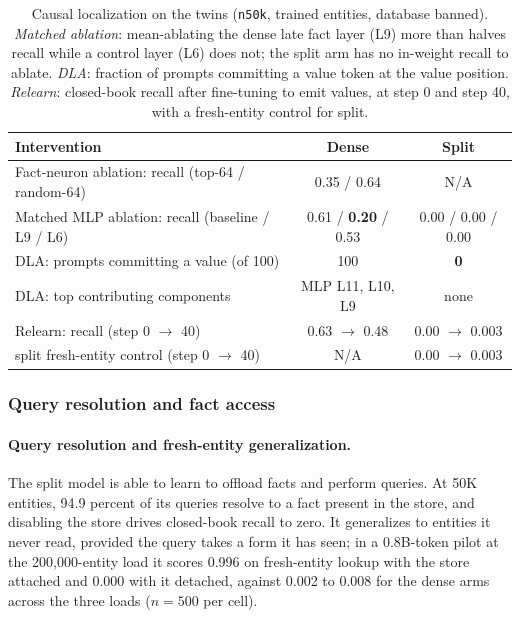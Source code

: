 \documentclass{article}
\begin{document}
\begin{table}[!htbp]
\centering
\small
\caption{Causal localization on the twins (\texttt{n50k}, trained entities, database banned). \emph{Matched ablation}: mean-ablating the dense late fact layer (L9) more than halves recall while a control layer (L6) does not; the split arm has no in-weight recall to ablate. \emph{DLA}: fraction of prompts committing a value token at the value position. \emph{Relearn}: closed-book recall after fine-tuning to emit values, at step 0 and step 40, with a fresh-entity control for split.}
\label{tab:mech_causal}
\begin{tabular}{lcc}
\toprule Intervention & Dense & Split \\
\midrule Fact-neuron ablation: recall (top-64 / random-64) & 0.35 / 0.64 & N/A \\
Matched MLP ablation: recall (baseline / L9 / L6) & 0.61 / \textbf{0.20} / 0.53 & 0.00 / 0.00 / 0.00 \\
DLA: prompts committing a value (of 100) & 100 & \textbf{0} \\
DLA: top contributing components & MLP L11, L10, L9 & none \\
Relearn: recall (step 0 $\rightarrow$ 40) & 0.63 $\rightarrow$ 0.48 & 0.00 $\rightarrow$ 0.003 \\
\quad split fresh-entity control (step 0 $\rightarrow$ 40) & N/A & 0.00 $\rightarrow$ 0.003 \\
\bottomrule
\end{tabular}
\end{table}

\subsubsection{Query resolution and fact access}

\paragraph{Query resolution and fresh-entity generalization.}
The split model is able to learn to offload facts and perform queries. At 50K entities, 94.9 percent of its queries resolve to a fact present in the store, and disabling the store drives closed-book recall to zero. It generalizes to entities it never read, provided the query takes a form it has seen; in a 0.8B-token pilot at the 200,000-entity load it scores 0.996 on fresh-entity lookup with the store attached and 0.000 with it detached, against 0.002 to 0.008 for the dense arms across the three loads ($n = 500$ per cell).
\end{document}
